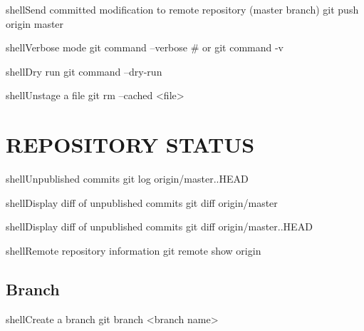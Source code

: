 \documentclass[10pt,a4paper]{article}
\begin{document}
\begin{multicols}{3}
\begin{codebox}{shell}{Send committed modification to remote repository (master branch)}
git push origin master

\end{codebox}

\begin{codebox}{shell}{Verbose mode}
git command --verbose
# or 
git command -v

\end{codebox}

\begin{codebox}{shell}{Dry run}
git command --dry-run

\end{codebox}

\begin{codebox}{shell}{Unstage a file}
git rm --cached <file>

\end{codebox}

\section{REPOSITORY STATUS}

\begin{codebox}{shell}{Unpublished commits}
git log origin/master..HEAD

\end{codebox}

\begin{codebox}{shell}{Display diff of unpublished commits}
git diff origin/master

\end{codebox}

\begin{codebox}{shell}{Display diff of unpublished commits}
git diff origin/master..HEAD

\end{codebox}

\begin{codebox}{shell}{Remote repository information}
git remote show origin

\end{codebox}

\subsection{Branch}

\begin{codebox}{shell}{Create a branch}
git branch <branch name>


\end{codebox}
\end{multicols}
\end{document}
